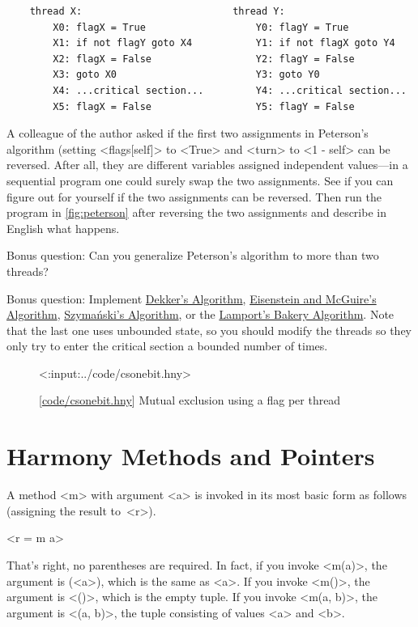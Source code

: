 \documentclass{report}
\newcommand{\harmonylink}[1]{%
[\href{https://harmony.cs.cornell.edu/#1}{\underline{#1}}]%
}
\newenvironment{code}{
\tcolorbox
}{
\endtcolorbox
}
\begin{document}
\begin{problems}
\begin{code}
\begin{verbatim}
    thread X:                          thread Y:
        X0: flagX = True                   Y0: flagY = True
        X1: if not flagY goto X4           Y1: if not flagX goto Y4
        X2: flagX = False                  Y2: flagY = False
        X3: goto X0                        Y3: goto Y0
        X4: ...critical section...         Y4: ...critical section...
        X5: flagX = False                  Y5: flagY = False
\end{verbatim}
\end{code}
\item \label{ex:reorder}
A colleague of the author asked if the first two assignments in
Peterson's algorithm (setting <{flags[self]}>
to <{True}> and <{turn}> to <{1 - self}> can be reversed.
After all, they are different variables assigned independent values---in a
sequential program one could surely swap the two assignments.
See if you can figure out for yourself if the two assignments can be
reversed.  Then run the program in \autoref{fig:peterson} after reversing
the two assignments and describe in English what happens.
\item Bonus question:
Can you generalize Peterson's algorithm to more than two threads?
\item Bonus question:
Implement
\href{https://en.wikipedia.org/wiki/Dekker%27s_algorithm}{Dekker's Algorithm},
\href{https://en.wikipedia.org/wiki/Eisenberg_%26_McGuire_algorithm}{Eisenstein and McGuire's Algorithm},
\href{https://en.wikipedia.org/wiki/Szymanski%27s_algorithm}{Szymański's Algorithm}, or the
\href{https://en.wikipedia.org/wiki/Lamport%27s_bakery_algorithm}{Lamport's Bakery Algorithm}.
Note that the last one uses unbounded state, so you should modify the threads so they
only try to enter the critical section a bounded number of times.
\end{problems}

\begin{figure}
\begin{code}
<{:input:../code/csonebit.hny}>
\end{code}
\caption{\harmonylink{code/csonebit.hny} Mutual exclusion using a flag per thread}
\label{fig:csonebit}
\end{figure}

\chapter{Harmony Methods and Pointers}
\label{ch:method}
%

A method <{m}> with argument <{a}> is invoked in its
most basic form as follows (assigning the result to~<{r}>).
\begin{code}
<{r = m a}>
\end{code}
That's right, no parentheses are required.  In fact, if you invoke
<{m(a)}>, the argument is (<{a}>), which is the same
as <{a}>.
If you invoke <{m()}>, the argument is <{()}>,
which is the empty tuple.
If you invoke <{m(a, b)}>, the argument is <{(a, b)}>,
the tuple consisting of values <{a}> and <{b}>.
\end{document}
